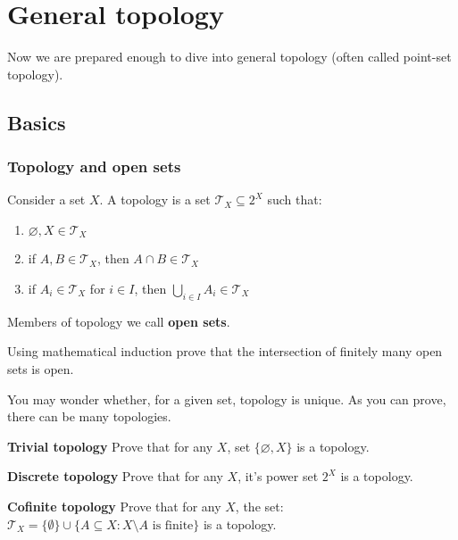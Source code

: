 
\newcommand{\Int}{\text{Int\,}}

\chapter{General topology}
\label{general_topology}
Now we are prepared enough to dive into general topology (often called point-set topology).

\section{Basics}
\subsection{Topology and open sets}
Consider a set $X$. A topology is a set $\mathcal{T}_X \subseteq 2^X $ such that:
\begin{enumerate}
	\item $\varnothing, X\in \mathcal{T}_X$
	\item if $A, B\in \mathcal{T}_X$, then $A\cap B\in \mathcal{T}_X$
	\item if $A_i\in \mathcal{T}_X$ for $i\in I$, then $\bigcup_{i\in I} A_i\in \mathcal T_X$
\end{enumerate}
Members of topology we call \textbf{open sets}.

\begin{prob}
	Using mathematical induction prove that the intersection of finitely many open sets is open.
\end{prob}

You may wonder whether, for a given set, topology is unique. As you can prove, there can be many topologies.

\begin{prob}
	\textbf{Trivial topology} Prove that for any $X$, set $\{\varnothing, X\}$ is a topology.
\end{prob}

\begin{prob}
	\textbf{Discrete topology} Prove that for any $X$, it's power set $2^X$ is a topology.
\end{prob}

\begin{prob}
	\textbf{Cofinite topology} Prove that for any $X$, the set:
  $\mathcal T_X=\{\emptyset\}\cup \{A\subseteq X : X\setminus A \text{ is finite}\}$ is a topology.
\end{prob}

